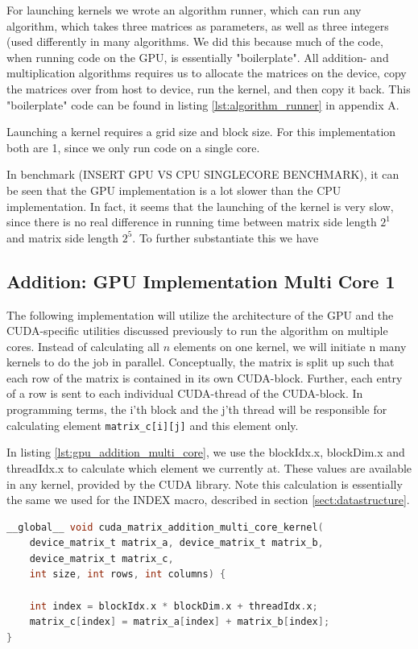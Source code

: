 For launching kernels we wrote an algorithm runner, which can run any algorithm, which takes three matrices as parameters, as well as three integers (used differently in many algorithms. We did this because much of the code, when running code on the GPU, is essentially "boilerplate". All addition- and multiplication algorithms requires us to allocate the matrices on the device, copy the matrices over from host to device, run the kernel, and then copy it back. This "boilerplate" code can be found in listing \ref{lst:algorithm_runner} in appendix A.

Launching a kernel requires a grid size and block size. For this implementation both are 1, since we only run code on a single core.

In benchmark (INSERT GPU VS CPU SINGLECORE BENCHMARK), it can be seen that the GPU implementation is a lot slower than the CPU implementation. In fact, it seems that the launching of the kernel is very slow, since there is no real difference in running time between matrix side length $2^1$ and matrix side length $2^5$. To further substantiate this we have %

\subsection{Addition: GPU Implementation Multi Core 1}
The following implementation will utilize the architecture of the GPU and the CUDA-specific utilities discussed previously to run the algorithm on multiple cores. Instead of calculating all $n$ elements on one kernel, we will initiate n many kernels to do the job in parallel. Conceptually, the matrix is split up such that each row of the matrix is contained in its own CUDA-block. Further, each entry of a row is sent to each individual CUDA-thread of the CUDA-block. In programming terms, the i'th block and the j'th thread will be responsible for calculating element \texttt{matrix\_c[i][j]} and this element only. 

In listing \ref{lst:gpu_addition_multi_core}, we use the blockIdx.x, blockDim.x and threadIdx.x to calculate which element we currently at. These values are available in any kernel, provided by the CUDA library. Note this calculation is essentially the same we used for the INDEX macro, described in section \ref{sect:datastructure}. 

\begin{lstlisting}[language=C, caption={GPU addition multi core}, label={lst:gpu_addition_multi_core}]
__global__ void cuda_matrix_addition_multi_core_kernel(
    device_matrix_t matrix_a, device_matrix_t matrix_b, 
    device_matrix_t matrix_c, 
    int size, int rows, int columns) {
    
    int index = blockIdx.x * blockDim.x + threadIdx.x;
    matrix_c[index] = matrix_a[index] + matrix_b[index];
}
\end{lstlisting}

